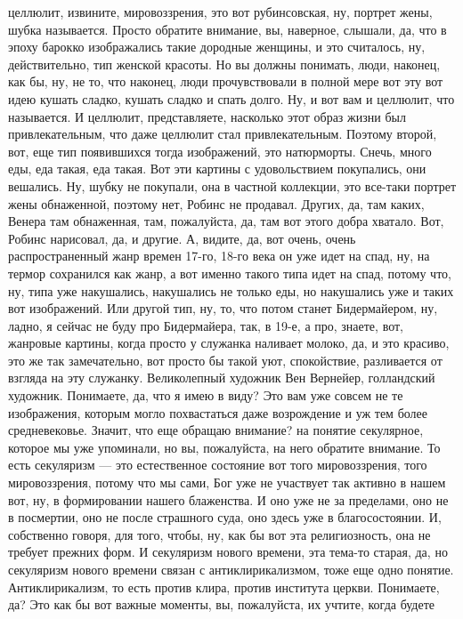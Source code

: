 целлюлит, извините, мировоззрения, это вот рубинсовская, ну, портрет жены, шубка
называется. Просто обратите внимание, вы, наверное, слышали, да, что в эпоху
барокко изображались такие дородные женщины, и это считалось, ну, действительно,
тип женской красоты. Но вы должны понимать, люди, наконец, как бы, ну, не то,
что наконец, люди прочувствовали в полной мере вот эту вот идею кушать сладко,
кушать сладко и спать долго. Ну, и вот вам и целлюлит, что называется. И
целлюлит, представляете, насколько этот образ жизни был привлекательным, что
даже целлюлит стал привлекательным. Поэтому второй, вот, еще тип появившихся
тогда изображений, это натюрморты. Снечь, много еды, еда такая, еда такая. Вот
эти картины с удовольствием покупались, они вешались. Ну, шубку не покупали, она
в частной коллекции, это все-таки портрет жены обнаженной, поэтому нет, Робинс
не продавал. Других, да, там каких, Венера там обнаженная, там, пожалуйста, да,
там вот этого добра хватало. Вот, Робинс нарисовал, да, и другие. А, видите, да,
вот очень, очень распространенный жанр времен 17-го, 18-го века он уже идет на
спад, ну, на термор сохранился как жанр, а вот именно такого типа идет на спад,
потому что, ну, типа уже накушались, накушались не только еды, но накушались уже
и таких вот изображений. Или другой тип, ну, то, что потом станет Бидермайером,
ну, ладно, я сейчас не буду про Бидермайера, так, в 19-е, а про, знаете, вот,
жанровые картины, когда просто у служанка наливает молоко, да, и это красиво,
это же так замечательно, вот просто бы такой уют, спокойствие, разливается от
взгляда на эту служанку. Великолепный художник Вен Вернейер, голландский
художник. Понимаете, да, что я имею в виду? Это вам уже совсем не те
изображения, которым могло похвастаться даже возрождение и уж тем более
средневековье. Значит, что еще обращаю внимание? на понятие секулярное, которое
мы уже упоминали, но вы, пожалуйста, на него обратите внимание. То есть
секуляризм — это естественное состояние вот того мировоззрения, того
мировоззрения, потому что мы сами, Бог уже не участвует так активно в нашем вот,
ну, в формировании нашего блаженства. И оно уже не за пределами, оно не в
посмертии, оно не после страшного суда, оно здесь уже в благосостоянии. И,
собственно говоря, для того, чтобы, ну, как бы вот эта религиозность, она не
требует прежних форм. И секуляризм нового времени, эта тема-то старая, да, но
секуляризм нового времени связан с антиклирикализмом, тоже еще одно понятие.
Антиклирикализм, то есть против клира, против института церкви. Понимаете, да?
Это как бы вот важные моменты, вы, пожалуйста, их учтите, когда будете
